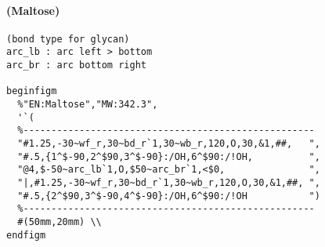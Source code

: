 \documentclass[a4paper]{article}
\begin{document}
\paragraph{(Maltose)}
\begin{verbatim}
(bond type for glycan)
arc_lb : arc left > bottom
arc_br : arc bottom right

beginfigm
  %"EN:Maltose","MW:342.3",
  '`(
  %----------------------------------------------------
  "#1.25,-30~wf_r,30~bd_r`1,30~wb_r,120,O,30,&1,##,   ",
  "#.5,{1^$-90,2^$90,3^$-90}:/OH,6^$90:/!OH,          ",
  "@4,$-50~arc_lb`1,O,$50~arc_br`1,<$0,               ",
  "|,#1.25,-30~wf_r,30~bd_r`1,30~wb_r,120,O,30,&1,##, ",
  "#.5,{2^$90,3^$-90,4^$-90}:/OH,6^$90:/!OH           ")
  %----------------------------------------------------
  #(50mm,20mm) \\
endfigm
\end{verbatim}
\newpage
\end{document}
